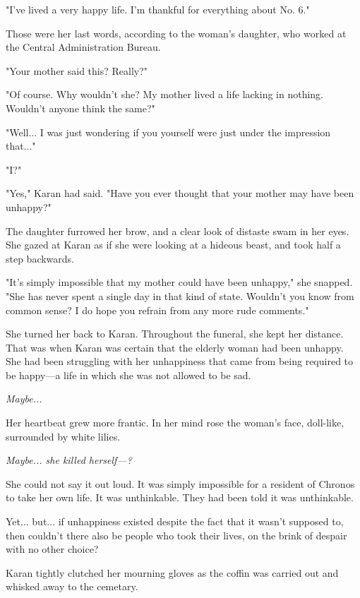 "I've lived a very happy life. I'm thankful for everything about No. 6."

Those were her last words, according to the woman's daughter, who worked
at the Central Administration Bureau.


"Your mother said this? Really?"

"Of course. Why wouldn't she? My mother lived a life lacking in nothing.
Wouldn't anyone think the same?"

"Well... I was just wondering if you yourself were just under the
impression that..."

"I?"

"Yes," Karan had said. "Have you ever thought that your mother may have
been unhappy?"

The daughter furrowed her brow, and a clear look of distaste swam in her
eyes. She gazed at Karan as if she were looking at a hideous beast, and
took half a step backwards.

"It's simply impossible that my mother could have been unhappy," she
snapped. "She has never spent a single day in that kind of state.
Wouldn't you know from common sense? I do hope you refrain from any more
rude comments."

She turned her back to Karan. Throughout the funeral, she kept her
distance. That was when Karan was certain that the elderly woman had
been unhappy. She had been struggling with her unhappiness that came
from being required to be happy---a life in which she was not allowed to
be sad.

\emph{Maybe...}

Her heartbeat grew more frantic. In her mind rose the woman's face,
doll-like, surrounded by white lilies.

\emph{Maybe... she killed herself---?}

She could not say it out loud. It was simply impossible for a resident
of Chronos to take her own life. It was unthinkable. They had been told
it was unthinkable.

Yet... but... if unhappiness existed despite the fact that it wasn't
supposed to, then couldn't there also be people who took their lives, on
the brink of despair with no other choice?

Karan tightly clutched her mourning gloves as the coffin was carried out
and whisked away to the cemetary.

